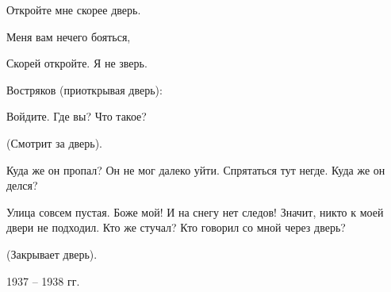 Откройте мне скорее дверь.
 
Меня вам нечего бояться,
 
Скорей откройте. Я не зверь.
 
\leavevmode\hspace{-1cm}
\fontsize{14}{16}\selectfont Востряков \normalsize (приоткрывая дверь):
 
Войдите. Где вы? Что такое?
 
\begin{center} 
(Смотрит за дверь).
\end{center}
 
Куда же он пропал? Он не мог далеко уйти. Спрятаться тут негде. Куда же он делся? 
 
Улица совсем пустая. Боже мой! И на снегу нет следов! Значит, никто к моей двери не подходил. Кто же стучал? Кто говорил со мной через дверь?
 
\begin{center}
(Закрывает дверь).
\end{center}
 
\begin{flushright}
1937 -- 1938 гг.
\end{flushright}